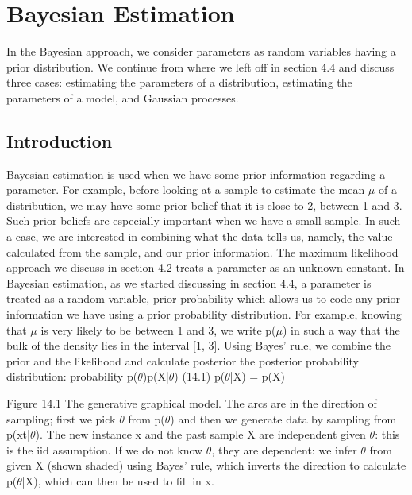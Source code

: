 \chapter{Bayesian Estimation}
\label{chap:14-bayesian-estimation}

In the Bayesian approach, we consider parameters as random variables having a prior distribution. We continue from where we left off in section 4.4 and discuss three cases: estimating the parameters of a distribution, estimating the parameters of a model, and Gaussian processes.

\section{Introduction}

Bayesian estimation is used when we have some prior information regarding a parameter. For example, before looking at a sample to estimate the mean $\mu$ of a distribution, we may have some prior belief that it is close to 2, between 1 and 3. Such prior beliefs are especially important when we have a small sample. In such a case, we are interested in combining what the data tells us, namely, the value calculated from the sample, and our prior information. The maximum likelihood approach we discuss in section 4.2 treats a parameter as an unknown constant. In Bayesian estimation, as we started discussing in section 4.4, a parameter is treated as a random variable, prior probability which allows us to code any prior information we have using a prior probability distribution. For example, knowing that $\mu$ is very likely to be between 1 and 3, we write p($\mu$) in such a way that the bulk of the density lies in the interval [1, 3]. Using Bayes’ rule, we combine the prior and the likelihood and calculate posterior the posterior probability distribution: probability p($\theta$)p(X|$\theta$) (14.1) p($\theta$|X) = p(X)

Figure 14.1 The generative graphical model. The arcs are in the direction of sampling; first we pick $\theta$ from p($\theta$) and then we generate data by sampling from p(xt|$\theta$). The new instance x and the past sample X are independent given $\theta$: this is the iid assumption. If we do not know $\theta$, they are dependent: we infer $\theta$ from given X (shown shaded) using Bayes’ rule, which inverts the direction to calculate p($\theta$|X), which can then be used to fill in x.

